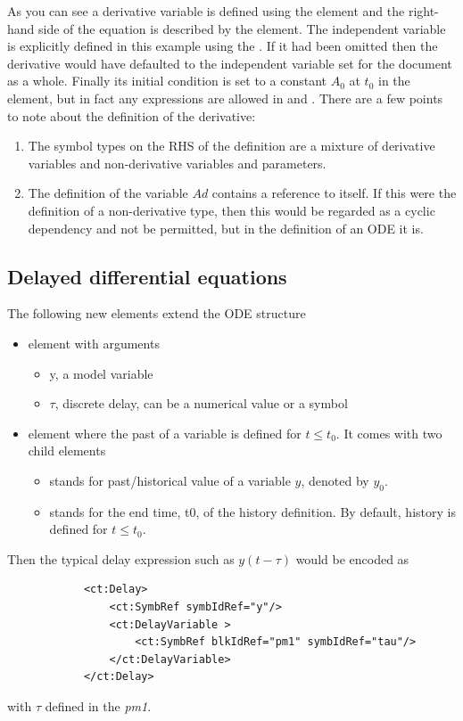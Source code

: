 As you can see a derivative variable is defined using the
 element and the right-hand side of the
equation is described by the  element. The independent
variable is explicitly defined in this example using the
. If it had been omitted then the
derivative would have defaulted to the independent variable set for
the \pharmml document as a whole. Finally its initial condition is
set to a constant $A_0$ at $t_0$ in the  element, but 
in fact any expressions are allowed in  and . 
There are a few points to note about the definition of the derivative:
%
\begin{enumerate}
\item The symbol types on the RHS of the definition are a mixture of
  derivative variables and non-derivative variables and
  parameters. 
\item The definition of the variable $Ad$ contains a reference to
  itself. If this were the definition of a non-derivative type, then this
  would be regarded as a cyclic dependency and not be permitted, but
  in the definition of an ODE it is.
\end{enumerate}


\subsection{Delayed differential equations}
\label{subsec:ddes}

The following new elements extend the ODE structure
\begin{itemize}
\item
{} element with arguments
\begin{itemize}
\item
y, a model variable
\item
$\tau$, discrete delay, can be a numerical value or a symbol
\end{itemize}
\item
{} element where the past of a variable is defined for $t \leq t_0$. 
It comes with two child elements
\begin{itemize}
\item
{} stands for past/historical value of a variable $y$, denoted by $y_0$.
\item
{} stands for the end time, t0, of the history definition. 
By default, history is defined for $t \leq t_0$.
\end{itemize}
\end{itemize}
Then the typical delay expression such as $y(t-\tau)$ would be encoded as
\lstset{language=XML}
\begin{lstlisting}
            <ct:Delay>
                <ct:SymbRef symbIdRef="y"/>
                <ct:DelayVariable >
                    <ct:SymbRef blkIdRef="pm1" symbIdRef="tau"/>
                </ct:DelayVariable>
            </ct:Delay>
\end{lstlisting}
with $\tau$ defined in the  \emph{pm1}.


